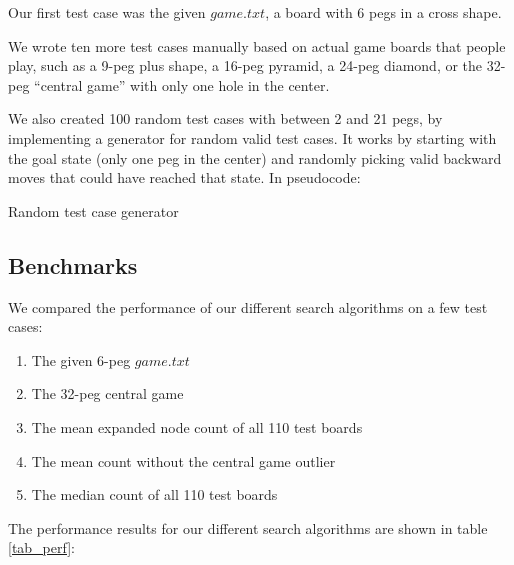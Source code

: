 \documentclass[11pt]{article}
\begin{document}
Our first test case was the given \(game.txt\), a board with 6 pegs in a
cross shape.

We wrote ten more test cases manually based on actual game boards that people
play, such as a 9-peg plus shape, a 16-peg pyramid, a 24-peg diamond, or the
32-peg ``central game'' with only one hole in the center.

We also created 100 random test cases with between 2 and 21 pegs, by
implementing a generator for random valid test cases. It works by starting
with the goal state (only one peg in the center) and randomly picking valid
backward moves that could have reached that state. In pseudocode:

\begin{algorithm}
\caption{Random test case generator}
\label{random_alg}
\begin{algorithmic}[1]
	\EndFor
	\State {}
\end{algorithmic}
\end{algorithm}

\subsection{Benchmarks}

We compared the performance of our different search algorithms on a few test cases:

\begin{enumerate}
\item The given 6-peg \(game.txt\)
\item The 32-peg central game
\item The mean expanded node count of all 110 test boards
\item The mean count without the central game outlier
\item The median count of all 110 test boards
\end{enumerate}

The performance results for our different search algorithms are shown in table \ref{tab_perf}:
\end{document}

